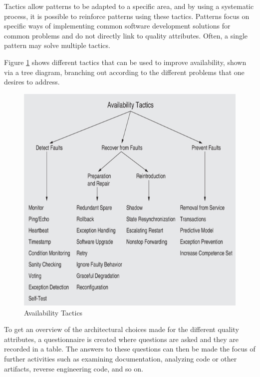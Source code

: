 Tactics allow patterns to be adapted to a specific area, and by using a systematic process, it is possible to reinforce patterns using these tactics.
Patterns focus on specific ways of implementing common software development solutions for common problems and do not directly link to quality attributes. Often, a single pattern may solve multiple tactics.

Figure \ref{fig:availability-tactics} shows different tactics that can be used to improve availability, shown via a tree diagram, branching out according to the different problems that one desires to address.

\begin{figure}[H]
    \centering
    \caption{Availability Tactics}
    \label{fig:availability-tactics}
    \includegraphics[width=0.7\linewidth]{images/Availability tactics.png}
\end{figure}

To get an overview of the architectural choices made for the different quality attributes, a questionnaire is created where questions are asked and they are recorded in a table. The answers to these questions can then be made the focus of further activities such as examining documentation, analyzing code or other artifacts, reverse engineering code, and so on.






